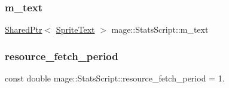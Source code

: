 \hypertarget{classmage_1_1_stats_script_a35bb45baabf290be684c8b67f30feeb7}{}\label{classmage_1_1_stats_script_a35bb45baabf290be684c8b67f30feeb7} 
\subsubsection{\texorpdfstring{m\+\_\+text}{m\_text}}
{\footnotesize\ttfamily \hyperlink{namespacemage_a1e01ae66713838a7a67d30e44c67703e}{Shared\+Ptr}$<$ \hyperlink{classmage_1_1_sprite_text}{Sprite\+Text} $>$ mage\+::\+Stats\+Script\+::m\+\_\+text\hspace{0.3cm}{\ttfamily [private]}}

\hypertarget{classmage_1_1_stats_script_acae1ac4fd880389c88818a8f72cbff2b}{}\label{classmage_1_1_stats_script_acae1ac4fd880389c88818a8f72cbff2b} 
\subsubsection{\texorpdfstring{resource\+\_\+fetch\+\_\+period}{resource\_fetch\_period}}
{\footnotesize\ttfamily const double mage\+::\+Stats\+Script\+::resource\+\_\+fetch\+\_\+period = 1.\hspace{0.3cm}{\ttfamily [static]}}

